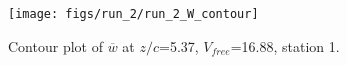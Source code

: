 \begin{figure}[H]
\centering
\texttt{[image: figs/run\_2/run\_2\_W\_contour]}
\caption{Contour plot of $\overline{w}$ at $z/c$=5.37, $V_{free}$=16.88, station 1.}
\label{fig:run_2_W_contour}
\end{figure}


